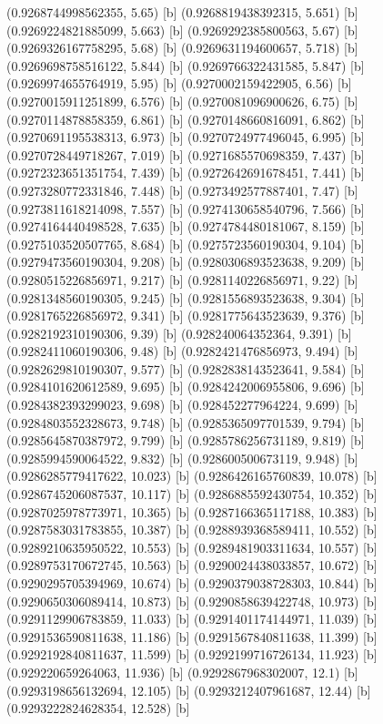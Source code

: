 {{{(0.9268744998562355, 5.65) [b] 
(0.9268819438392315, 5.651) [b] 
(0.9269224821885099, 5.663) [b] 
(0.9269292385800563, 5.67) [b] 
(0.9269326167758295, 5.68) [b] 
(0.9269631194600657, 5.718) [b] 
(0.9269698758516122, 5.844) [b] 
(0.9269766322431585, 5.847) [b] 
(0.9269974655764919, 5.95) [b] 
(0.9270002159422905, 6.56) [b] 
(0.9270015911251899, 6.576) [b] 
(0.9270081096900626, 6.75) [b] 
(0.9270114878858359, 6.861) [b] 
(0.9270148660816091, 6.862) [b] 
(0.9270691195538313, 6.973) [b] 
(0.9270724977496045, 6.995) [b] 
(0.9270728449718267, 7.019) [b] 
(0.9271685570698359, 7.437) [b] 
(0.9272323651351754, 7.439) [b] 
(0.9272642691678451, 7.441) [b] 
(0.9273280772331846, 7.448) [b] 
(0.9273492577887401, 7.47) [b] 
(0.9273811618214098, 7.557) [b] 
(0.9274130658540796, 7.566) [b] 
(0.9274164440498528, 7.635) [b] 
(0.9274784480181067, 8.159) [b] 
(0.9275103520507765, 8.684) [b] 
(0.9275723560190304, 9.104) [b] 
(0.9279473560190304, 9.208) [b] 
(0.9280306893523638, 9.209) [b] 
(0.9280515226856971, 9.217) [b] 
(0.9281140226856971, 9.22) [b] 
(0.9281348560190305, 9.245) [b] 
(0.9281556893523638, 9.304) [b] 
(0.9281765226856972, 9.341) [b] 
(0.9281775643523639, 9.376) [b] 
(0.9282192310190306, 9.39) [b] 
(0.928240064352364, 9.391) [b] 
(0.9282411060190306, 9.48) [b] 
(0.9282421476856973, 9.494) [b] 
(0.9282629810190307, 9.577) [b] 
(0.9282838143523641, 9.584) [b] 
(0.9284101620612589, 9.695) [b] 
(0.9284242006955806, 9.696) [b] 
(0.9284382393299023, 9.698) [b] 
(0.928452277964224, 9.699) [b] 
(0.9284803552328673, 9.748) [b] 
(0.9285365097701539, 9.794) [b] 
(0.9285645870387972, 9.799) [b] 
(0.9285786256731189, 9.819) [b] 
(0.9285994590064522, 9.832) [b] 
(0.928600500673119, 9.948) [b] 
(0.9286285779417622, 10.023) [b] 
(0.9286426165760839, 10.078) [b] 
(0.9286745206087537, 10.117) [b] 
(0.9286885592430754, 10.352) [b] 
(0.9287025978773971, 10.365) [b] 
(0.9287166365117188, 10.383) [b] 
(0.9287583031783855, 10.387) [b] 
(0.9288939368589411, 10.552) [b] 
(0.9289210635950522, 10.553) [b] 
(0.9289481903311634, 10.557) [b] 
(0.9289753170672745, 10.563) [b] 
(0.9290024438033857, 10.672) [b] 
(0.9290295705394969, 10.674) [b] 
(0.9290379038728303, 10.844) [b] 
(0.9290650306089414, 10.873) [b] 
(0.9290858639422748, 10.973) [b] 
(0.9291129906783859, 11.033) [b] 
(0.9291401174144971, 11.039) [b] 
(0.9291536590811638, 11.186) [b] 
(0.9291567840811638, 11.399) [b] 
(0.9292192840811637, 11.599) [b] 
(0.9292199716726134, 11.923) [b] 
(0.929220659264063, 11.936) [b] 
(0.9292867968302007, 12.1) [b] 
(0.9293198656132694, 12.105) [b] 
(0.9293212407961687, 12.44) [b] 
(0.9293222824628354, 12.528) [b] 
}}}
